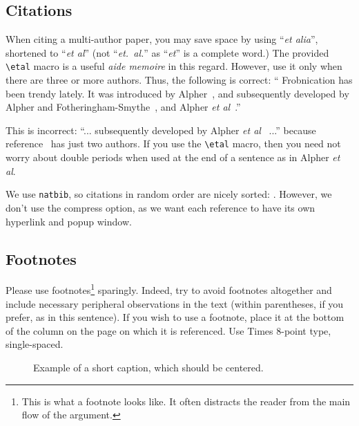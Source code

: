 \documentclass[extendedabs]{recpad2k}
\def\etal{\emph{et al}\bmvaOneDot}
\begin{document}
\subsection{Citations}
When citing a multi-author paper, you may save space by using ``{\em et
alia}'', shortened to ``\etal'' (not ``{\em et.\ al.}'' as ``{\em et}'' is
a complete word.)  The provided \verb'\etal' macro is a useful {\em aide
memoire} in this regard.  However, use it only when there are three or more
authors.  Thus, the following is correct: `` Frobnication has been trendy
lately.  It was introduced by Alpher~\cite{Alpher02}, and subsequently
developed by Alpher and Fotheringham-Smythe~\cite{Alpher03}, and Alpher
\etal~\cite{Alpher04}.''

This is incorrect: ``... subsequently developed by Alpher \etal~\cite{Alpher03} ...''
because reference~\cite{Alpher03} has just two authors.  If you use the
\verb'\etal' macro, then you need not worry about double periods
when used at the end of a sentence as in Alpher \etal.

We use {\tt natbib}, so citations in random order are nicely sorted:
 \cite{Alpher03,Alpher02,Authors06b,Authors06}.  However, we don't use the
compress option, as we want each reference to have its own hyperlink and
popup window.

\subsection{Footnotes}

Please use footnotes\footnote {This is what a footnote looks like.  It
often distracts the reader from the main flow of the argument.} sparingly.
Indeed, try to avoid footnotes altogether and include necessary peripheral
observations in 
the text (within parentheses, if you prefer, as in this sentence).  If you
wish to use a footnote, place it at the bottom of the column on the page on
which it is referenced. Use Times 8-point type, single-spaced.


\begin{figure}
\begin{center}
\fbox{\rule{0pt}{2in} \rule{.9\linewidth}{0pt}}
\end{center}
   \caption{Example of a short caption, which should be centered.}
\label{fig:short}
\end{figure}
\end{document}
